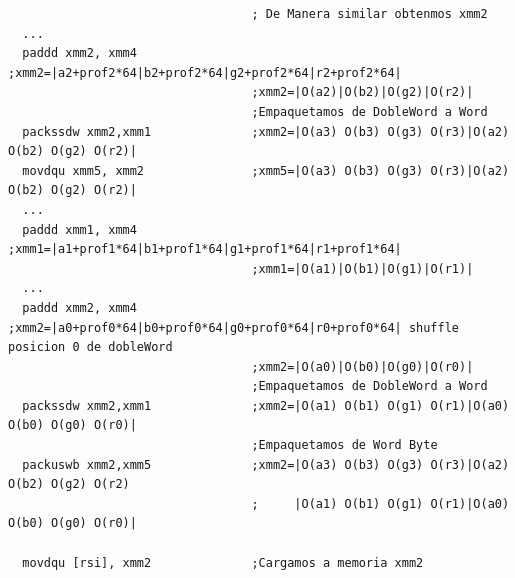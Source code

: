 \begin{codesnippet}
\begin{verbatim}    
                                  ; De Manera similar obtenmos xmm2
  ...
  paddd xmm2, xmm4                ;xmm2=|a2+prof2*64|b2+prof2*64|g2+prof2*64|r2+prof2*64|
                                  ;xmm2=|O(a2)|O(b2)|O(g2)|O(r2)|	
                                  ;Empaquetamos de DobleWord a Word	
  packssdw xmm2,xmm1              ;xmm2=|O(a3) O(b3) O(g3) O(r3)|O(a2) O(b2) O(g2) O(r2)|
  movdqu xmm5, xmm2               ;xmm5=|O(a3) O(b3) O(g3) O(r3)|O(a2) O(b2) O(g2) O(r2)|
  ...
  paddd xmm1, xmm4                ;xmm1=|a1+prof1*64|b1+prof1*64|g1+prof1*64|r1+prof1*64|
                                  ;xmm1=|O(a1)|O(b1)|O(g1)|O(r1)|						
  ...
  paddd xmm2, xmm4                ;xmm2=|a0+prof0*64|b0+prof0*64|g0+prof0*64|r0+prof0*64| shuffle posicion 0 de dobleWord
                                  ;xmm2=|O(a0)|O(b0)|O(g0)|O(r0)|                   
                                  ;Empaquetamos de DobleWord a Word
  packssdw xmm2,xmm1              ;xmm2=|O(a1) O(b1) O(g1) O(r1)|O(a0) O(b0) O(g0) O(r0)|						
                                  ;Empaquetamos de Word Byte
  packuswb xmm2,xmm5              ;xmm2=|O(a3) O(b3) O(g3) O(r3)|O(a2) O(b2) O(g2) O(r2)
                                  ;     |O(a1) O(b1) O(g1) O(r1)|O(a0) O(b0) O(g0) O(r0)|                      

  movdqu [rsi], xmm2              ;Cargamos a memoria xmm2                        			
\end{verbatim}
\end{codesnippet}
